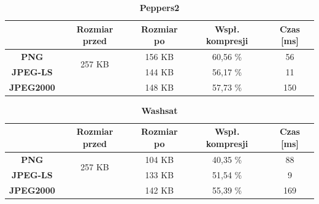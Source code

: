 \begin{table}[!h]
	\centering
	\caption{\textbf{Peppers2}}
	\label{my-label}
	\begin{tabular}{|c|c|c|c|c|}                                             
		\hline
		& \textbf{Rozmiar przed} & \textbf{Rozmiar po} & \textbf{Wspł. kompresji} & \textbf{Czas {[}ms{]}} \\ \hline 
		\textbf{PNG}      &          \multicolumn{1}{c|}{\multirow{2}{*}{257 KB}}             &      156 KB               &     60,56 \%                    &          56                   \\\cline{3-5}
		\textbf{JPEG-LS}  &                        &       144 KB              &       56,17 \%                  &             11             \\\cline{3-5}
		\textbf{JPEG2000} &                        &       148 KB              &       57,73 \%                  &        150              \\ \hline
	\end{tabular}
\end{table}

\begin{table}[!h]
	\centering
	\caption{\textbf{Washsat}}
	\label{my-label}
	\begin{tabular}{|c|c|c|c|c|}                                             
		\hline
		& \textbf{Rozmiar przed} & \textbf{Rozmiar po} & \textbf{Wspł. kompresji} & \textbf{Czas {[}ms{]}} \\ \hline 
		\textbf{PNG}      &          \multicolumn{1}{c|}{\multirow{2}{*}{257 KB}}             &         104 KB            &     40,35 \%                    &          88                   \\\cline{3-5}
		\textbf{JPEG-LS}  &                        &      133 KB               &          51,54 \%               &           9               \\\cline{3-5}
		\textbf{JPEG2000} &                        &      142 KB               &          55,39 \%               &     169                 \\ \hline
	\end{tabular}
\end{table}


